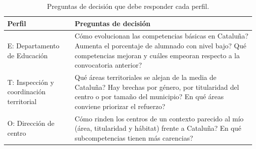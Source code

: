\documentclass[12pt, a4paper, oneside]{report}
\begin{document}
\begin{table}[H]
\centering
\small
\renewcommand{\arraystretch}{1.1}
\begin{tabularx}{\textwidth}{@{} >{\raggedright\arraybackslash}p{3.4cm} X @{}}
\toprule
\textbf{Perfil} & \textbf{Preguntas de decisión} \\ \midrule
E: Departamento de Educación & \textquestiondown{}Cómo evolucionan las competencias básicas en Cataluña? \textquestiondown{}Aumenta el porcentaje de alumnado con nivel bajo? \textquestiondown{}Qué competencias mejoran y cuáles empeoran respecto a la convocatoria anterior? \\ \addlinespace
T: Inspección y coordinación territorial & \textquestiondown{}Qué áreas territoriales se alejan de la media de Cataluña? \textquestiondown{}Hay brechas por género, por titularidad del centro o por tamaño del municipio? \textquestiondown{}En qué áreas conviene priorizar el refuerzo? \\ \addlinespace
O: Dirección de centro & \textquestiondown{}Cómo rinden los centros de un contexto parecido al mío (área, titularidad y hábitat) frente a Cataluña? \textquestiondown{}En qué subcompetencias tienen más carencias? \\ \bottomrule
\end{tabularx}
\caption{Preguntas de decisión que debe responder cada perfil.}
\label{tab:preguntas}
\end{table}
\end{document}
